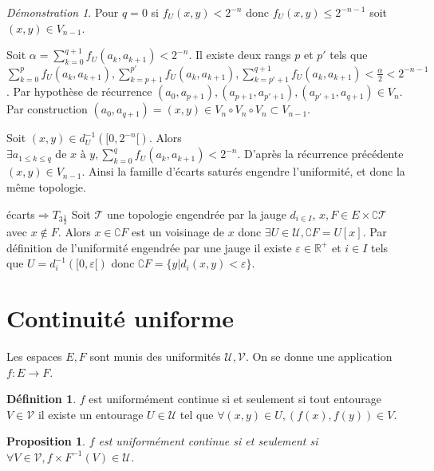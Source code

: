 \documentclass[a4paper, 11pt, french]{book}
\newenvironment{itemise}{\itemize}{\enditemize}
\theoremstyle{plain} %
\newtheorem{proposition}{Proposition}
\theoremstyle{definition} %
\newtheorem{definition}{Définition}
\theoremstyle{remark} %
\newtheorem*{demonstration}{Démonstration}
\newcommand{\1}{\mathds{1}}
\newcommand{\infegal}{\leqslant}
\newcommand{\inv}[1]{#1^{-1}}
\newcommand{\R}{\mathbb{R}}
\begin{document}
\begin{demonstration}
\begin{itemise}
\begin{itemise}
\begin{itemise}
				\item Pour $q=0$ si $f_U(x, y)<2^{-n}$ donc $f_U(x, y)\infegal2^{-n-1}$ soit $(x, y)\in V_{n-1}$.
				\item Soit $\alpha=\sum_{k=0}^{q+1}f_U(a_k, a_{k+1})<2^{-n}$.
				Il existe deux rangs $p$ et $p'$ tels que $\sum_{k=0}^pf_U(a_k, a_{k+1}), \sum_{k=p+1}^{p'}f_U(a_k, a_{k+1}), \sum_{k=p'+1}^{q+1}f_U(a_k, a_{k+1})<\frac{\alpha}{2}<2^{-n-1}$.
				Par hypothèse de récurrence $(a_0, a_{p+1}), (a_{p+1}, a_{p'+1}), (a_{p'+1}, a_{q+1})\in V_n$.
				Par construction $(a_0, a_{q+1})=(x, y)\in V_n\circ V_n\circ V_n\subset V_{n-1}$.
			\end{itemise}
			\item Soit $(x, y)\in\inv{d_U}([0, 2^{-n}[)$.
			Alors $\exists a_{1\infegal k\infegal q}\text{ de }x\text{ à }y, \sum_{k=0}^qf_U(a_k, a_{k+1})<2^{-n}$.
			D'après la récurrence précédente $(x, y)\in V_{n-1}$.
		\end{itemise}
		Ainsi la famille d'écarts saturés engendre l'uniformité, et donc la même topologie.
		\item[écarts$\Rightarrow T_{3\frac{1}{2}}$] Soit $\mathscr{T}$ une topologie engendrée par la jauge $d_{i\in I}$, $x, F\in E\times\complement\mathscr{T}$ avec $x\notin F$.
		Alors $x\in\complement F$ est un voisinage de $x$ donc $\exists U\in\mathscr{U}, \complement F=U[x]$.
		Par définition de l'uniformité engendrée par une jauge il existe $\varepsilon\in\R^+$ et $i\in I$ tels que $U=\inv{d_i}([0, \varepsilon[)$ donc $\complement F=\{y|d_i(x, y)<\varepsilon\}$.
	\end{itemise}
\end{demonstration}

\section{Continuité uniforme}

Les espaces $E, F$ sont munis des uniformités $\mathscr{U}, \mathscr{V}$.
On se donne une application $f:E\rightarrow F$.

\begin{definition}
	$f$ est uniformément continue si et seulement si tout entourage $V\in\mathscr{V}$ il existe un entourage $U\in\mathscr{U}$ tel que $\forall (x, y)\in U, (f(x), f(y))\in V$.
\end{definition}

\begin{proposition}
	$f$ est uniformément continue si et seulement si $\forall V\in\mathscr{V}, \inv{f\times F}(V)\in\mathscr{U}$.
\end{proposition}
\end{document}
